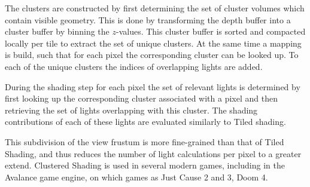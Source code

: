 The clusters are constructed by first determining the set of cluster volumes which contain
visible geometry. This is done by transforming the depth buffer into a cluster buffer by
binning the $z$-values. This cluster buffer is sorted and compacted locally per tile to
extract the set of unique clusters. At the same time a mapping is build, such that
for each pixel the corresponding cluster can be looked up.
To each of the unique clusters the indices of overlapping lights are added.

During the shading step for each pixel the set of relevant lights is determined
by first looking up the corresponding cluster associated with a pixel and then
retrieving the set of lights overlapping with this cluster. The shading contributions
of each of these lights are evaluated similarly to Tiled shading.

This subdivision of the view frustum is more fine-grained than that of Tiled Shading, and
thus reduces the number of light calculations per pixel to a greater extend.
Clustered Shading is used in several modern games, including in the Avalance
game engine\cite{}, on which games as Just Cause 2 and 3\cite{persson2013practical}, Doom 4\cite{Tatarchuk:2016:ARR:2897826.2940292}.




